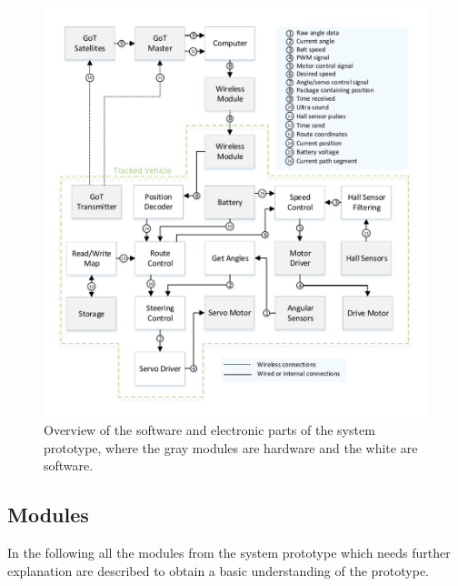 \begin{figure}[H]
	\centering
	\includegraphics[scale=.9]{figures/systemOverview2}
	\caption{Overview of the software and electronic parts of the system prototype, where the gray modules are hardware and the white are software.}
	\label{fig:systemOverview2}
\end{figure}\vspace{-5mm}

\subsection{Modules}
In the following all the modules from the system prototype which needs further explanation are described to obtain a basic understanding of the prototype.

%

